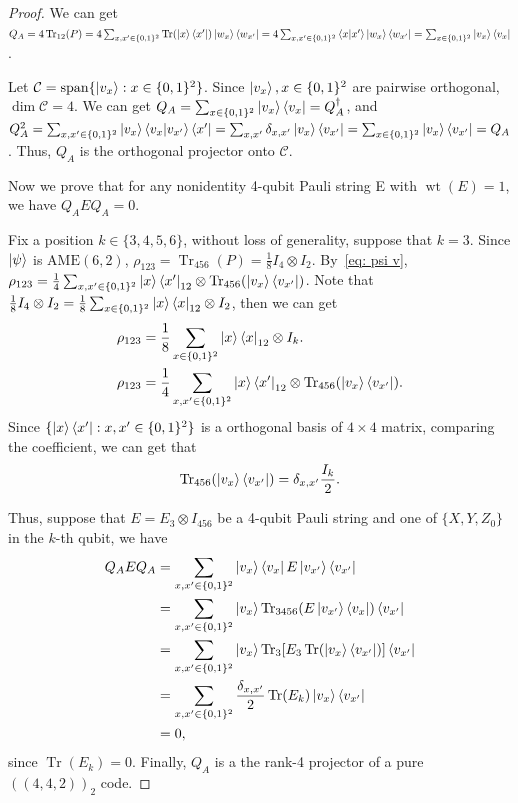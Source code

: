 \begin{proof}
    We can get $Q_A=4\operatorname{Tr}_{12}(P)= 4\sum_{x,x'\in\{0,1\}^2} \operatorname{Tr}(\ket{x}\bra{x'})\ket{w_x}\bra{w_{x'}}=4 \sum_{x,x'\in\{0,1\}^2}\braket{x|x'}\ket{w_x}\bra{w_{x'}}=\sum_{x\in\{0,1\}^2}\ket{v_x}\bra{v_x}$.

    Let $\mathcal{C}=\operatorname{span}\{\ket{v_x}:x\in\{0,1\}^2\}$. Since $\ket{v_x},x\in\{0,1\}^2$ are pairwise orthogonal, $\operatorname{dim}\mathcal{C}=4$. We can get $Q_A=\sum_{x\in\{0,1\}^2}\ket{v_x}\bra{v_x}=Q_A^\dagger$, and $Q_A^2=\sum_{x,x'\in\{0,1\}^2}\ket{v_x}\braket{v_x|v_{x'}}\bra{x'}=\sum_{x,x'}\delta_{x,x'}\ket{v_x}\bra{v_{x'}}=\sum_{x\in\{0,1\}^2}\ket{v_x}\bra{v_{x'}}=Q_A$. Thus, $Q_A$ is the orthogonal projector onto $\mathcal{C}$.

    Now we prove that for any nonidentity 4-qubit Pauli string E with $\operatorname{wt}(E)=1$, we have $Q_AEQ_A=0$.

    Fix a position $k\in \{3,4,5,6\}$, without loss of generality, suppose that $k=3$. Since $\ket{\psi}$ is $\mathrm{AME}(6,2)$, $\rho_{123}=\operatorname{Tr}_{456}(P)=\frac{1}{8}I_4\otimes I_2$. By~\eqref{eq: psi v}, $\rho_{123}=\frac{1}{4}\sum_{x,x'\in\{0,1\}^2}\ket{x}\bra{x'}_{12}\otimes \operatorname{Tr}_{456}(\ket{v_x}\bra{v_{x'}})$. Note that $\frac{1}{8}I_4\otimes I_2=\frac{1}{8}\sum_{x\in\{0,1\}^2}\ket{x}\bra{x}_{12}\otimes I_2$, then we can get
    \begin{align}
        \rho_{123}&=\frac{1}{8}\sum_{x\in\{0,1\}^2}\ket{x}\bra{x}_{12}\otimes I_k.\\
        \rho_{123}&=\frac{1}{4}\sum_{x,x'\in\{0,1\}^2}\ket{x}\bra{x'}_{12}\otimes \operatorname{Tr}_{456}(\ket{v_x}\bra{v_{x'}}).
    \end{align}
    Since $\{\ket{x}\bra{x'}:x,x'\in\{0,1\}^2\}$ is a orthogonal basis of $4\times 4$ matrix, comparing the coefficient, we can get that 
    \begin{equation}
        \operatorname{Tr}_{456}(\ket{v_x}\bra{v_{x'}})=\delta_{x,x'}\frac{I_k}{2}.
    \end{equation}

    Thus, suppose that $E=E_3\otimes I_{456}$ be a 4-qubit Pauli string and one of $\{X,Y,Z_0\}$ in the $k$-th qubit, we have
    \begin{align}
        Q_AEQ_A&=\sum_{x,x'\in\{0,1\}^2}\ket{v_x}\bra{v_{x}}E \ket{v_{x'}}\bra{v_{x'}}\\
        &=\sum_{x,x'\in\{0,1\}^2}\ket{v_x}\operatorname{Tr}_{3456}(E\ket{v_{x'}}\bra{v_x})\bra{v_{x'}}\\
        &=\sum_{x,x'\in\{0,1\}^2}\ket{v_x}\operatorname{Tr}_3[E_3\operatorname{Tr}(\ket{v_x}\bra{v_{x'}})]\bra{v_{x'}}\\
        &=\sum_{x,x'\in\{0,1\}^2}\frac{\delta_{x,x'}}{2} \operatorname{Tr}(E_k) \ket{v_x}\bra{v_{x'}}\\
        &=0,
    \end{align}
    since $\operatorname{Tr}(E_k)=0$. Finally, $Q_A$ is a the rank-4 projector of a pure $((4,4,2))_2$ code.
\end{proof}

